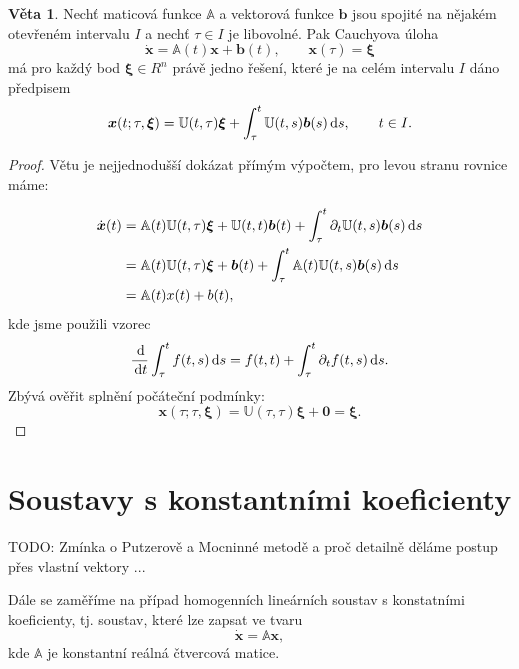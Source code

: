 \documentclass[a4paper, 12pt]{book}
\theoremstyle{definition}
\newtheorem{theorem}{Věta}[section]
\def\d{\,{\rm d}}               %
\def\vc#1{\mathbf{\boldsymbol{#1}}}     %
\def\tn#1{{\mathbb{#1}}}    %
\def\prtl{\partial}                                        %
\def\todo#1{{\color{green}TODO:} #1}
\begin{document}
\begin{theorem}
Nechť maticová funkce ${\tn A}$ a vektorová funkce $\vc b$ jsou spojité na 
nějakém otevřeném intervalu $I$ a nechť $\tau \in I$ je libovolné. Pak Cauchyova
úloha
\[
    \dot{\vc x} = {\tn A}(t)\vc x+\vc b(t),\qquad \vc x(\tau)=\vc\xi
\]
má pro každý bod $\vc\xi\in R^n$ právě jedno řešení, které je na celém intervalu 
$I$ dáno předpisem
\[
    \vc x(t;\tau,\vc\xi) = {\tn U}(t,\tau)\vc\xi+\int_\tau^t{\tn U}(t,s) \vc b(s)\d s,\qquad t\in I.
\]
\end{theorem}
\begin{proof}
Větu je nejjednodušší dokázat přímým výpočtem, pro levou stranu rovnice máme:

\begin{align*}
   \dot{\vc x}(t) &= \tn A(t) \tn U(t,\tau) \vc \xi +\tn U(t,t) \vc b(t) + \int_\tau^t \prtl_t{\tn U}(t,s) \vc b(s) \d s\\
                  &= \tn A(t) \tn U(t,\tau) \vc \xi + \vc b(t) + \int_\tau^t \tn A(t)\tn U(t,s) \vc b(s) \d s\\
                  &= \tn A(t) x(t) + b(t),
\end{align*}
kde jsme použili vzorec
\[ 
   \frac{\d}{\d t} \int_\tau^t f(t,s) \d s = f(t,t) + \int_\tau^t \prtl_t f(t,s) \d s.
\]
Zbývá ověřit splnění počáteční podmínky:
\[
   \vc x(\tau;\tau, \vc \xi) = {\tn U}(\tau, \tau) \vc \xi + \vc 0 = \vc \xi.
\]
\end{proof}



\section{Soustavy s konstantními koeficienty}
\label{konst_koef}

\todo{Zmínka o Putzerově a Mocninné metodě a proč detailně děláme postup přes vlastní vektory ...}

Dále se zaměříme na případ homogenních lineárních soustav s konstatními 
koeficienty, tj. soustav, které lze zapsat ve tvaru
\begin{equation}
    \label{eq:const_coef}
    \dot{\vc x} = {\tn A}\vc x,
\end{equation}
kde $\tn A$ je konstantní reálná čtvercová matice.
\end{document}
